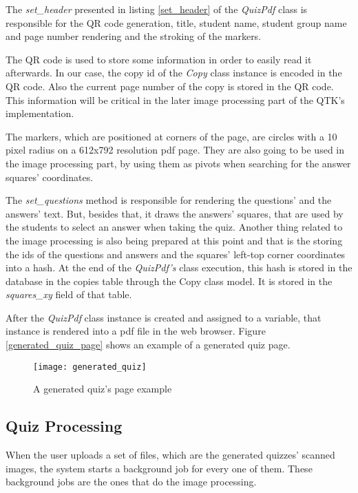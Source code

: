 The \textit{set\_header} presented in listing \ref{set_header} of the \textit{QuizPdf} class is responsible for the QR code generation, title, student name, student group name and page number rendering and the stroking of the markers. 




The QR code is used to store some information in order to easily read it afterwards. In our case, the copy id of the \textit{Copy} class instance 
is encoded in the QR code. Also the current page number of the copy is stored in the QR code. This information will be critical in the later image processing part of the QTK's implementation. 

The markers, which are positioned at corners of the page, are circles with a 10 pixel radius on a 612x792 resolution pdf page. They are also going to be used in the image processing part, by using them as pivots when searching for the answer squares' coordinates.

The \textit{set\_questions} method is responsible for rendering the questions' and the answers' text. But, besides that, it draws the answers' squares, that are used by the students to select an answer when taking the quiz. Another thing related to the image processing is also being prepared at this point and that is the storing the ids of the questions and answers and the squares' left-top corner coordinates into a hash. At the end of the \textit{QuizPdf's} class execution, this hash is stored in the database in the copies table through the Copy class model. It is stored in the \textit{squares\_xy} field of that table.

After the \textit{QuizPdf} class instance is created and assigned to a variable, that instance is rendered into a pdf file in the web browser. Figure \ref{generated_quiz_page} shows an example of a generated quiz page. 

\begin{figure}[!ht]
\centering
\texttt{[image: generated\_quiz]}
\caption{A generated quiz's page example}\label{qenerated_quiz_page}
\end{figure}


\subsection{Quiz Processing}

When the user uploads a set of files, which are the generated quizzes' scanned images, the system starts a background job for every one of them. These background jobs are the ones that do the image processing. 


